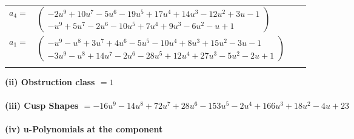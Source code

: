 \documentclass[1p]{elsarticle_modified}
\theoremstyle{definition}
\begin{document}
\begin{tabular}{m{7pt} m{180pt} m{7pt} m{180pt} }
\flushright $a_{4}=$&$\begin{pmatrix}-2 u^9+10 u^7-5 u^6-19 u^5+17 u^4+14 u^3-12 u^2+3 u-1\\- u^9+5 u^7-2 u^6-10 u^5+7 u^4+9 u^3-6 u^2- u+1\end{pmatrix}$ \\
\flushright $a_{1}=$&$\begin{pmatrix}- u^9- u^8+3 u^7+4 u^6-5 u^5-10 u^4+8 u^3+15 u^2-3 u-1\\-3 u^9- u^8+14 u^7-2 u^6-28 u^5+12 u^4+27 u^3-5 u^2-2 u+1\end{pmatrix}$\\&\end{tabular}
\flushleft \textbf{(ii) Obstruction class $= 1$}\\~\\
\flushleft \textbf{(iii) Cusp Shapes $= -16 u^9-14 u^8+72 u^7+28 u^6-153 u^5-2 u^4+166 u^3+18 u^2-4 u+23$}\\~\\
\newpage\renewcommand{\arraystretch}{1}
\flushleft \textbf{(iv) u-Polynomials at the component}\newline \\
\end{document}

